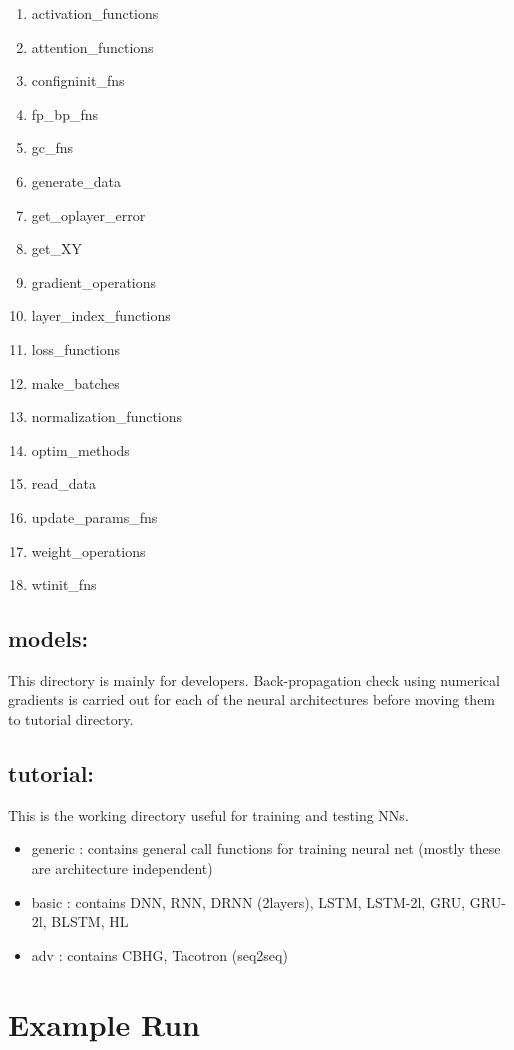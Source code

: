 \documentclass[a4paper,11pt]{article}
\begin{document}
\begin{enumerate}
\item[] activation\_functions
\item[] attention\_functions
\item[] configninit\_fns
\item[] fp\_bp\_fns
\item[] gc\_fns
\item[] generate\_data
\item[] get\_oplayer\_error
\item[] get\_XY
\item[] gradient\_operations
\item[] layer\_index\_functions
\item[] loss\_functions
\item[] make\_batches
\item[] normalization\_functions
\item[] optim\_methods
\item[] read\_data
\item[] update\_params\_fns
\item[] weight\_operations
\item[] wtinit\_fns
\end{enumerate}

\subsection{models:}
This directory is mainly for developers. Back-propagation check using numerical gradients is carried out for each of the neural architectures before moving them to tutorial directory.

\subsection{tutorial:}
This is the working directory useful for training and testing NNs.

\begin{itemize}
\item generic : contains general call functions for training neural net (mostly these are architecture independent)
\item basic : contains DNN, RNN, DRNN (2layers), LSTM, LSTM-2l, GRU, GRU-2l, BLSTM, HL
\item adv : contains CBHG, Tacotron (seq2seq)
\end{itemize}

\section{Example Run}

\newpage


\end{document}
